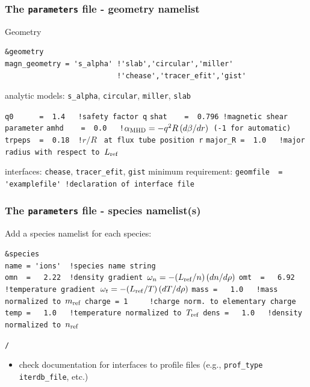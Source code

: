 \documentclass[9pt]{beamer}
\begin{document}
\begin{frame}[fragile]
  \frametitle{The {\tt parameters} file - geometry namelist}


\begin{block}{Geometry}

\begin{block}

\begin{verbatim}
&geometry
magn_geometry = 's_alpha' !'slab','circular','miller'
                          !'chease','tracer_efit','gist'
\end{verbatim}
\end{block}
\begin{block}{analytic models: {\tt s\_alpha}, {\tt circular}, {\tt miller}, {\tt slab}}

\verb|q0      =  1.4   !safety factor q|
\verb|shat    =  0.796 !magnetic shear parameter|
\verb|amhd    =  0.0   !|${\alpha_{\rm MHD}=-q^2R\,(d\beta/dr)}$\verb| (-1 for automatic)|
\verb|trpeps  =  0.18  !|$r/R$ \verb| at flux tube position r|
\verb|major_R =  1.0   !major radius with respect to |$L_{\rm ref}$
\end{block}

\begin{block}{interfaces: {\tt chease}, {\tt tracer\_efit}, {\tt gist}}
minimum requirement:
\verb|geomfile  =  'examplefile' !declaration of interface file|
\end{block}
\end{block}

\end{frame}


\begin{frame}[fragile]
  \frametitle{The {\tt parameters} file - species namelist({\bf s})}

\begin{block}

Add a species namelist for each species:
\begin{block}

\verb|&species|\\
\verb|name = 'ions'  !species name string|\\
\verb|omn  =   2.22  !density gradient |$\omega_n=-(L_{\rm ref}/n)\,(dn/d\rho)$
\verb|omt  =   6.92  !temperature gradient |$\omega_t=-(L_{\rm ref}/T)\,(dT/d\rho)$
\verb|mass =   1.0   !mass normalized to |$m_{\rm ref}$
\verb|charge = 1     !charge norm. to elementary charge|
\verb|temp =   1.0   !temperature normalized to |$T_{\rm ref}$
\verb|dens =   1.0   !density normalized to |$n_{\rm ref}$

\verb|/|
\end{block}
\begin{itemize}
 \item check documentation for interfaces to profile files (e.g., {\tt prof\_type}
 {\tt iterdb\_file}, etc.)
\end{itemize}

\end{block}

\end{frame}
\end{document}
